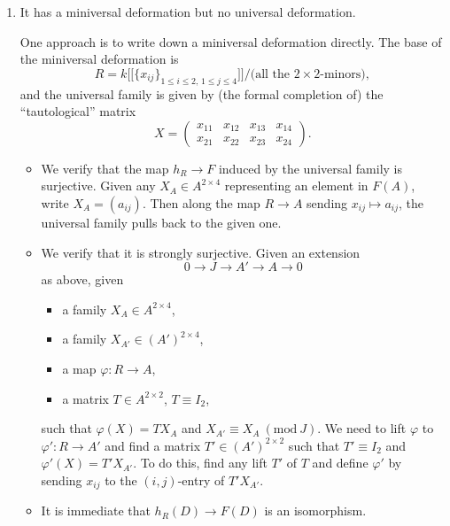 \begin{enumerate}[label=\arabic*.]
To find an obstructed deformation, let $A=k[t]/(t^2)$ and $A'=k[t]/(t^3)$. Take
\[
X=
\begin{pmatrix}
t & 0 & 0 & 0\\
0 & t & 0 & 0
\end{pmatrix}.
\]
Then the obstruction class is the class of $(t^2,0,\ldots,0)$ in $\bigl((t^2)/(t^3)\bigr)^{\oplus 6}$.

\item It has a miniversal deformation but no universal deformation.

One approach is to write down a miniversal deformation directly. The base of the miniversal deformation is
\[
R = k\bigl[\bigl[\{x_{ij}\}_{1\le i\le 2,\,1\le j\le 4}\bigr]\bigr]\Big/\bigl(\text{all the }2\times 2\text{-minors}\bigr),
\]
and the universal family is given by (the formal completion of) the ``tautological'' matrix
\[
X=
\begin{pmatrix}
x_{11} & x_{12} & x_{13} & x_{14}\\
x_{21} & x_{22} & x_{23} & x_{24}
\end{pmatrix}.
\]

\begin{itemize}
\item We verify that the map $h_R\to F$ induced by the universal family is surjective.
Given any $X_A\in A^{2\times 4}$ representing an element in $F(A)$, write $X_A=(a_{ij})$.
Then along the map $R\to A$ sending $x_{ij}\mapsto a_{ij}$, the universal family pulls back to the given one.

\item We verify that it is strongly surjective. Given an extension
\[
0\to J\to A'\to A\to 0
\]
as above, given
\begin{itemize}
\item a family $X_A\in A^{2\times 4}$,
\item a family $X_{A'}\in (A')^{2\times 4}$,
\item a map $\varphi:R\to A$,
\item a matrix $T\in A^{2\times 2}$, $T\equiv I_2$,
\end{itemize}
such that $\varphi(X)=TX_A$ and $X_{A'}\equiv X_A\ (\mathrm{mod}\ J)$.
We need to lift $\varphi$ to $\varphi':R\to A'$ and find a matrix $T'\in (A')^{2\times 2}$ such that
$T'\equiv I_2$ and $\varphi'(X)=T'X_{A'}$.
To do this, find any lift $T'$ of $T$ and define $\varphi'$ by sending $x_{ij}$ to the $(i,j)$-entry of $T'X_{A'}$.

\item It is immediate that $h_R(D)\to F(D)$ is an isomorphism.
\end{itemize}


\end{enumerate}
